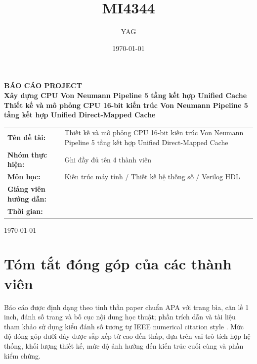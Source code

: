\documentclass[11pt,a4paper]{article}
\title{MI4344}
\author{YAG}
\date{\today}
\theoremstyle{definition}
\theoremstyle{remark}
\begin{document}
	
	\begin{titlepage}
		\centering
		{\large \textbf{BÁO CÁO PROJECT}}\\[1.5cm]
		{\Large \textbf{Xây dựng CPU Von Neumann Pipeline 5 tầng kết hợp Unified Cache}}\\[1cm]
		{\LARGE \textbf{Thiết kế và mô phỏng CPU 16-bit kiến trúc Von Neumann Pipeline 5 tầng kết hợp Unified Direct-Mapped Cache}}\\[2cm]
		
		\begin{tabular}{>{\bfseries}p{4cm}p{10cm}}
			Tên đề tài: & Thiết kế và mô phỏng CPU 16-bit kiến trúc Von Neumann Pipeline 5 tầng kết hợp Unified Direct-Mapped Cache \\
			Nhóm thực hiện: & Ghi đầy đủ tên 4 thành viên \\
			Môn học: & Kiến trúc máy tính / Thiết kế hệ thống số / Verilog HDL \\
			Giảng viên hướng dẫn: & \dotfill \\
			Thời gian: & \dotfill \\
		\end{tabular}
		
		\vfill
		{\large \today}
	\end{titlepage}
	
	\newpage
	\section*{Tóm tắt đóng góp của các thành viên}
	Báo cáo được định dạng theo tinh thần paper chuẩn APA với trang bìa, căn lề 1 inch, đánh số trang và bố cục nội dung học thuật; phần trích dẫn và tài liệu tham khảo sử dụng kiểu đánh số tương tự IEEE numerical citation style \cite{apaformat,ieeestyle}. Mức độ đóng góp dưới đây được sắp xếp từ cao đến thấp, dựa trên vai trò tích hợp hệ thống, khối lượng thiết kế, mức độ ảnh hưởng đến kiến trúc cuối cùng và phần kiểm chứng.
	
\end{document}
